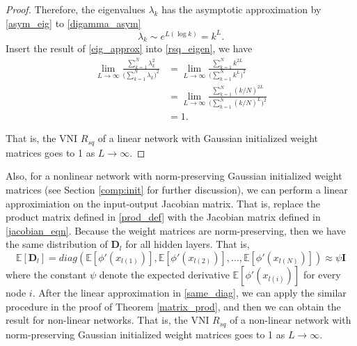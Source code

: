 \begin{proof}
    Therefore, the eigenvalues $\lambda_k$ has the asymptotic approximation by \eqref{asym_eig} to
    \eqref{digamma_asym}
    \begin{equation}
        \lambda_k\sim e^{L(\log k)}=k^L.
        \label{eig_approx}
    \end{equation}
    Insert the result of \eqref{eig_approx} into \eqref{rsq_eigen}, we have
    \begin{equation}
        \begin{aligned}
        \lim_{L\rightarrow\infty}\frac{\sum_{k=1}^N \lambda_k^2}{\big(\sum_{k=1}^N \lambda_k\big)^2}
        &=\lim_{L\rightarrow\infty}\frac{\sum_{k=1}^N k^{2L}}{\big(\sum_{k=1}^N k^L\big)^2}\\
        &=\lim_{L\rightarrow\infty}\frac{\sum_{k=1}^N (k/N)^{2L}}{\big(\sum_{k=1}^N (k/N)^L\big)^2}\\
        &=1.
        \end{aligned}
        \label{eig_result}
    \end{equation}

    That is, the VNI $R_{sq}$ of
    a linear network with Gaussian initialized weight matrices goes to 1 as $L\rightarrow\infty$.

\end{proof}

Also, for a nonlinear network with norm-preserving Gaussian initialized weight matrices (see
Section \ref{comp:init} for further discussion), we can perform a linear approximiation on the
input-output Jacobian matrix. That is, replace the product matrix defined in \eqref{prod_def}
with the Jacobian matrix defined in \eqref{jacobian_eqn}.
Because the weight matrices are norm-preserving, then we have the same distribution of $\mathbf{D}_l$
for all hidden layers. That is,
\begin{equation}
    \mathbb{E}[\mathbf{D}_l]=
    diag(\mathbb{E}[\phi'(x_{l(1)})], \mathbb{E}[\phi'(x_{l(2)})], \dots, \mathbb{E}[\phi'(x_{l(N)})])
    \approx \psi \mathbf{I}
    \label{same_diag}
\end{equation}
where the constant $\psi$ denote the expected derivative $\mathbb{E}[\phi'(x_{l(i)})]$ for every
node $i$. After the linear approximation in \eqref{same_diag}, we can apply the similar procedure
in the proof of Theorem \ref{matrix_prod}, and then we can obtain the result for non-linear
networks. That is, the VNI $R_{sq}$ of
a non-linear network with
norm-preserving Gaussian initialized weight matrices goes to 1 as $L\rightarrow\infty$.

